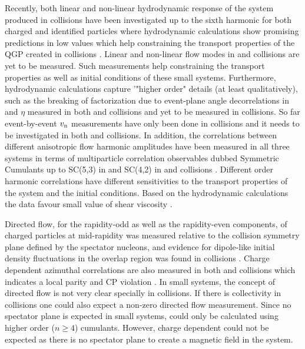 \documentclass[../report.tex]{subfiles}
\newcommand{\vn}{\ensuremath{v_{\rm n}\Xspace} }
\begin{document}
Recently, both linear and non-linear hydrodynamic response of the system produced in \PbPb collisions have been investigated up to the sixth harmonic for both charged and identified particles where hydrodynamic calculations show promising predictions in low \pT values which help constraining the transport properties of the QGP created in \PbPb collisions \cite{Acharya:2017zfg}. Linear and non-linear flow modes in \pp and \pPb collisions are yet to be measured. Such measurements help constraining the transport properties as well as initial conditions of these small systems. Furthermore, hydrodynamic calculations capture '"higher order" details (at least qualitatively), such as the breaking of factorization due to event-plane angle decorrelations in \pT and $\eta$ measured in both \PbPb and \pPb collisions \cite{Khachatryan:2015oea,Sirunyan:2017gyb,Acharya:2017ino} and yet to be measured in \pp collisions. So far event-by-event \vn measurements have only been done in \PbPb collisions \cite{Aad:2013xma,Sirunyan:2017fts} and it needs to be investigated in both \pPb and \pp collisions. In addition, the correlations between different anisotropic flow harmonic amplitudes have been measured in all three systems in terms of multiparticle correlation observables dubbed Symmetric Cumulants up to SC(5,3) in \PbPb and SC(4,2) in \pPb and \pp collisions \cite{Aad:2014fla,Aad:2015lwa,ALICE:2016kpq,Sirunyan:2017uyl,Acharya:2017gsw,Aaboud:2018syf}. Different order harmonic correlations have different sensitivities to the transport properties of the system and the initial conditions. Based on the hydrodynamic calculations the data favour small value of shear viscosity \cite{Zhu:2016puf}.

Directed flow, for the rapidity-odd as well as the rapidity-even components, of charged particles at mid-rapidity was measured relative to the collision symmetry plane defined by the spectator nucleons, and evidence for dipole-like initial density fluctuations in the overlap region was found in \PbPb collisions \cite{Abelev:2013cva}. Charge dependent azimuthal correlations are also measured in both \PbPb and \pPb collisions which indicates a local parity and CP violation \cite{Adam:2015vje,Sirunyan:2017tax,Acharya:2017fau,Sirunyan:2017quh,Khachatryan:2016got}. In small systems, the concept of directed flow is not very clear specially in \pp collisions. If there is collectivity in \pp collisions one could also expect a non-zero directed flow measurement. Since no spectator plane is expected in small systems, \vone could only be calculated using higher order ($n\geq 4$) cumulants. However, charge dependent \vone could not be expected as there is no spectator plane to create a magnetic field in the system.
\end{document}
